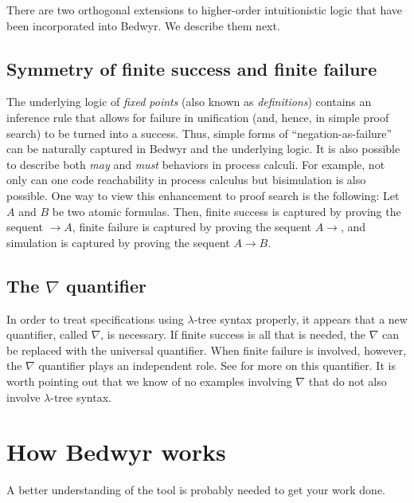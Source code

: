 \documentclass{article}
\begin{document}
\bigskip
There are two orthogonal extensions to higher-order intuitionistic
logic that have been incorporated into Bedwyr.   We describe them next.

\subsection{Symmetry of finite success and finite failure}

The underlying logic of {\em fixed points} (also known as {\em
definitions})
\cite{girard92mail,schroeder-Heister93lics,mcdowell03tcs,momigliano03types}
contains an inference rule that allows for failure in unification
(and, hence, in simple proof search) to be turned into a success.
Thus, simple forms of ``negation-as-failure'' can be naturally
captured in Bedwyr and the underlying logic.  It is also possible to
describe both {\em may} and {\em must} behaviors in process calculi.
For example, not only can one code reachability in process calculus
but bisimulation is also possible.  One way to view this enhancement
to proof search is the following: Let $A$ and $B$ be two atomic
formulas.  Then, finite success is captured by proving the sequent
$\longrightarrow A$, finite failure is captured by proving the sequent
$A\longrightarrow$, and simulation is captured by proving the sequent
$A\longrightarrow B$.

\subsection{The $\nabla$ quantifier}

In order to treat specifications using $\lambda$-tree syntax
properly, it appears that a new quantifier, called $\nabla$, is
necessary.  If finite success is all that is needed, the $\nabla$ can
be replaced with the universal quantifier.  When finite failure is
involved, however, the $\nabla$ quantifier plays an independent role.
See \cite{miller05tocl,tiu04phd,tiu05concur} for more on this
quantifier.  It is worth pointing out that we know of no examples
involving $\nabla$ that do not also involve $\lambda$-tree syntax.


\section{How Bedwyr works}
\label{sec:howto}

A better understanding of the tool is probably needed to get your work
done.
\end{document}
